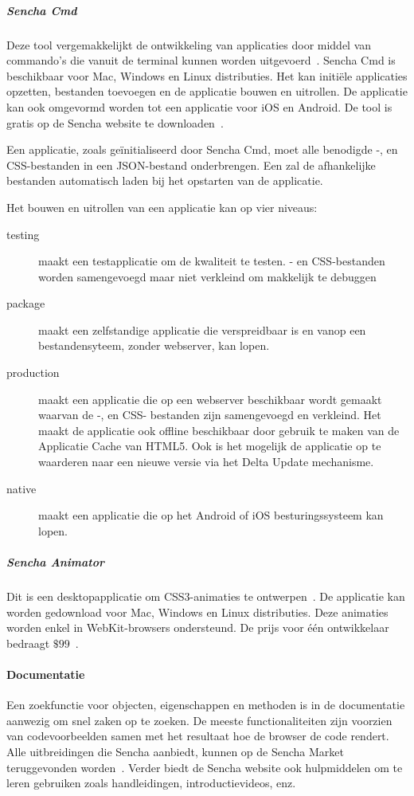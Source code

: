 \subparagraph{Sencha Cmd}
Deze tool vergemakkelijkt de ontwikkeling van \st{} applicaties door middel van commando's die vanuit de terminal kunnen worden uitgevoerd~\cite{Sencha2012}.
Sencha Cmd is beschikbaar voor Mac, Windows en Linux distributies.
Het kan initiële applicaties opzetten,  bestanden toevoegen en de applicatie bouwen en uitrollen.
De applicatie kan ook omgevormd worden tot een  applicatie voor iOS en Android.
De tool is gratis op de Sencha website te downloaden~\cite{Inc.}.

Een applicatie,  zoals geïnitialiseerd door Sencha Cmd,  moet alle benodigde \js-, en CSS-bestanden in een JSON-bestand onderbrengen.
Een  zal de afhankelijke bestanden automatisch laden bij het opstarten van de applicatie.

Het bouwen en uitrollen van een applicatie kan op vier niveaus:
\begin{description}
  \item [testing] maakt een testapplicatie om de kwaliteit te testen.  \js- en CSS-bestanden worden samengevoegd maar niet verkleind om makkelijk te debuggen
  \item [package] maakt een zelfstandige applicatie die verspreidbaar is en vanop een bestandensyteem,  zonder webserver,  kan lopen.
  \item [production] maakt een applicatie die op een webserver beschikbaar wordt gemaakt waarvan de \js-, en CSS- bestanden zijn samengevoegd en verkleind.  Het maakt de applicatie ook offline beschikbaar door gebruik te maken van de Applicatie Cache van HTML5.  Ook is het mogelijk de applicatie op te waarderen naar een nieuwe versie via het Delta Update mechanisme.
  \item [native] maakt een  applicatie die op het Android of iOS besturingssysteem kan lopen.
\end{description}

\subparagraph{Sencha Animator}
Dit is een desktopapplicatie om CSS3-animaties te ontwerpen~\cite{Sencha2012b}.  
De applicatie kan worden gedownload voor Mac, Windows en Linux distributies.
Deze animaties worden enkel in WebKit-browsers ondersteund.
De prijs voor één ontwikkelaar bedraagt $\$99$~\cite{Inc.}.

\paragraph{Documentatie}
Een zoekfunctie voor objecten,  eigenschappen en methoden is in de documentatie aanwezig om snel zaken op te zoeken.  
De meeste functionaliteiten zijn voorzien van codevoorbeelden samen met het resultaat hoe de browser de code rendert.  
Alle uitbreidingen die Sencha aanbiedt, kunnen op de Sencha Market teruggevonden worden~\cite{Sencha2013}.
Verder biedt de Sencha website ook hulpmiddelen om \st{} te leren gebruiken zoals handleidingen, introductievideos, enz.

